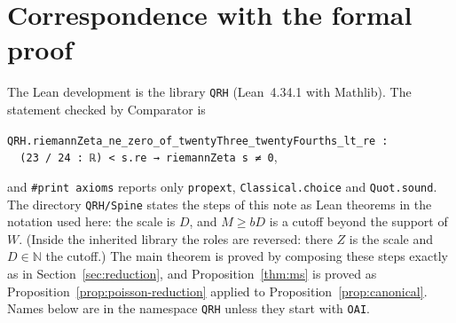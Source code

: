 \section{Correspondence with the formal proof}\label{app:lean}

The Lean development is the library \texttt{QRH} (Lean~4.34.1 with Mathlib). The statement
checked by Comparator is
\begin{center}
\texttt{QRH.riemannZeta\_ne\_zero\_of\_twentyThree\_twentyFourths\_lt\_re :}\\
\texttt{\ \ (23 / 24 : ℝ) < s.re → riemannZeta s ≠ 0},
\end{center}
and \texttt{\#print axioms} reports only \texttt{propext}, \texttt{Classical.choice} and
\texttt{Quot.sound}. The directory \texttt{QRH/Spine} states the steps of this note as Lean
theorems in the notation used here: the scale is $D$, and $M\ge bD$ is a cutoff beyond the
support of $W$. (Inside the inherited library the roles are reversed: there $Z$ is the scale and
$D\in\mathbb N$ the cutoff.) The main theorem is proved by composing these steps exactly as in
Section~\ref{sec:reduction}, and Proposition~\ref{thm:ms} is proved as
Proposition~\ref{prop:poisson-reduction} applied to Proposition~\ref{prop:canonical}. Names below
are in the namespace \texttt{QRH} unless they start with \texttt{OAI}.

